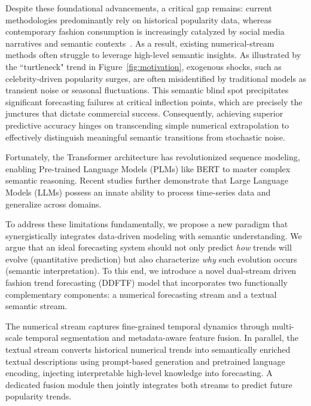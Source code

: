 \documentclass[Afour,sageh,times]{sagej}
\newcommand{\zhang}[1]{\textcolor{red}{[revise] #1}}
\begin{document}
{Despite these foundational advancements, a critical gap remains: current methodologies predominantly rely on historical popularity data, whereas contemporary fashion consumption is increasingly catalyzed by social media narratives and semantic contexts~\cite{cabeza2023exploring}.  As a result, existing numerical-stream methods often struggle to leverage high-level semantic insights. As illustrated by the ``turtleneck" trend in Figure~\ref{fig:motivation}, exogenous shocks, such as celebrity-driven popularity surges, are often misidentified by traditional models as transient noise or seasonal fluctuations. This semantic blind spot precipitates significant forecasting failures at critical inflection points, which are precisely the junctures that dictate commercial success. Consequently, achieving superior predictive accuracy hinges on transcending simple numerical extrapolation to effectively distinguish meaningful semantic transitions from stochastic noise.

Fortunately, the Transformer architecture \cite{vaswani2017attention} has revolutionized sequence modeling, enabling Pre-trained Language Models (PLMs) like BERT \cite{devlin2018bert} to master complex semantic reasoning. Recent studies \cite{zhou2023one} further demonstrate that Large Language Models (LLMs) possess an innate ability to process time-series data and generalize across domains. 

To address these limitations fundamentally, we propose a new paradigm that synergistically integrates data-driven modeling with semantic understanding. 
We argue that an ideal forecasting system should not only predict \emph{how} trends will evolve (quantitative prediction) but also characterize \emph{why} such evolution occurs (semantic interpretation). To this end, we introduce a novel dual-stream driven fashion trend forecasting (DDFTF) model that incorporates two functionally complementary components: a numerical forecasting stream and a textual semantic stream.

The numerical stream captures fine-grained temporal dynamics through multi-scale temporal segmentation and metadata-aware feature fusion. In parallel, the textual stream converts historical numerical trends into semantically enriched textual descriptions using prompt-based generation and pretrained language encoding, injecting interpretable high-level knowledge into forecasting. A dedicated fusion module then jointly integrates both streams to predict future popularity trends.

}
\end{document}
